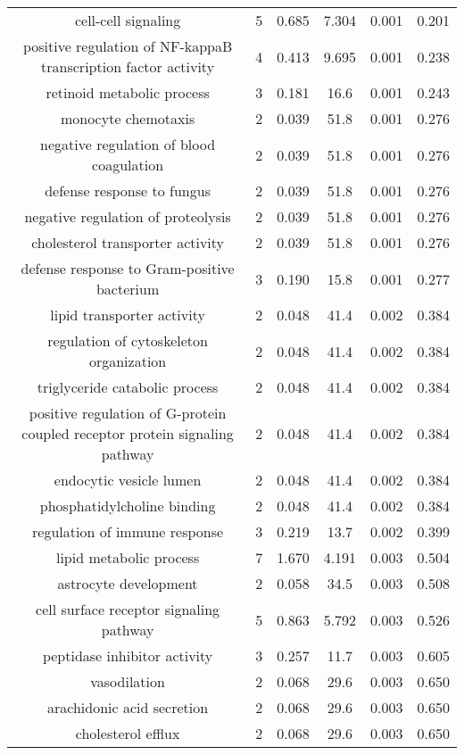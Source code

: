 \documentclass[USLetter,5pt]{article}
\begin{document}
\begin{table}[ht]
\begin{adjustbox}{width = 1\textwidth}
\begin{tabular}{|c|c|c|c|c|c|}
cell-cell signaling & 5 &  0.685 &  7.304 &  0.001 &  0.201\\
positive regulation of NF-kappaB transcription factor activity & 4 &  0.413 &  9.695 &  0.001 &  0.238\\
retinoid metabolic process & 3 &  0.181 &   16.6 &  0.001 &  0.243\\
monocyte chemotaxis & 2 &  0.039 &   51.8 &  0.001 &  0.276\\
negative regulation of blood coagulation & 2 &  0.039 &   51.8 &  0.001 &  0.276\\
defense response to fungus & 2 &  0.039 &   51.8 &  0.001 &  0.276\\
negative regulation of proteolysis & 2 &  0.039 &   51.8 &  0.001 &  0.276\\
cholesterol transporter activity & 2 &  0.039 &   51.8 &  0.001 &  0.276\\
defense response to Gram-positive bacterium & 3 &  0.190 &   15.8 &  0.001 &  0.277\\
lipid transporter activity & 2 &  0.048 &   41.4 &  0.002 &  0.384\\
regulation of cytoskeleton organization & 2 &  0.048 &   41.4 &  0.002 &  0.384\\
triglyceride catabolic process & 2 &  0.048 &   41.4 &  0.002 &  0.384\\
positive regulation of G-protein coupled receptor protein signaling pathway & 2 &  0.048 &   41.4 &  0.002 &  0.384\\
endocytic vesicle lumen & 2 &  0.048 &   41.4 &  0.002 &  0.384\\
phosphatidylcholine binding & 2 &  0.048 &   41.4 &  0.002 &  0.384\\
regulation of immune response & 3 &  0.219 &   13.7 &  0.002 &  0.399\\
lipid metabolic process & 7 &  1.670 &  4.191 &  0.003 &  0.504\\
astrocyte development & 2 &  0.058 &   34.5 &  0.003 &  0.508\\
cell surface receptor signaling pathway & 5 &  0.863 &  5.792 &  0.003 &  0.526\\
peptidase inhibitor activity & 3 &  0.257 &   11.7 &  0.003 &  0.605\\
vasodilation & 2 &  0.068 &   29.6 &  0.003 &  0.650\\
arachidonic acid secretion & 2 &  0.068 &   29.6 &  0.003 &  0.650\\
cholesterol efflux & 2 &  0.068 &   29.6 &  0.003 &  0.650\\

\end{tabular}
\end{adjustbox}
\end{table}
\end{document}
